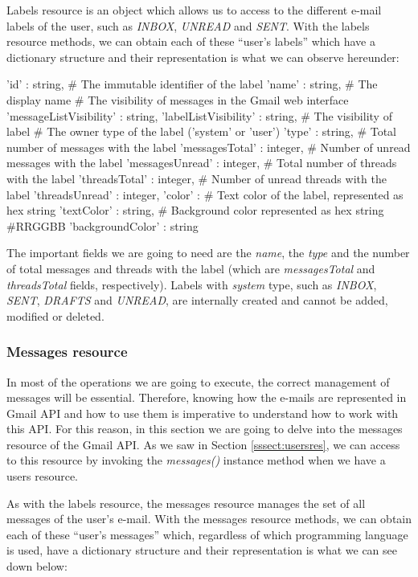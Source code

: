 Labels resource is an object which allows us to access to the different e-mail labels of the user, such as \textit{INBOX}, \textit{UNREAD} and \textit{SENT}. With the labels resource methods, we can obtain each of these ``user's labels'' which have a dictionary structure and their representation is what we can observe hereunder:

\begin{python}
	{
		'id' : string, # The immutable identifier of the label
		'name' : string, # The display name
		# The visibility of messages in the Gmail web interface
		'messageListVisibility' : string,
		'labelListVisibility' : string, # The visibility of label
		# The owner type of the label ('system' or 'user')
		'type' : string,
		# Total number of messages with the label
		'messagesTotal' : integer,
		# Number of unread messages with the label
		'messagesUnread' : integer,
		# Total number of threads with the label
		'threadsTotal' : integer,
		# Number of unread threads with the label
		'threadsUnread' : integer,
		'color' : {
			# Text color of the label, represented as hex string
			'textColor' : string,
			# Background color represented as hex string #RRGGBB
			'backgroundColor' : string 
		}
	}
\end{python}

The important fields we are going to need are the \textit{name}, the \textit{type} and the number of total messages and threads with the label (which are \textit{messagesTotal} and \textit{threadsTotal} fields, respectively). Labels with \textit{system} type, such as \textit{INBOX}, \textit{SENT}, \textit{DRAFTS} and \textit{UNREAD}, are internally created and cannot be added, modified or deleted.

\subsubsection{Messages resource}\label{sssect:msgres}
In most of the operations we are going to execute, the correct management of messages will be essential. Therefore, knowing how the e-mails are represented in Gmail API and how to use them is imperative to understand how to work with this API. For this reason, in this section we are going to delve into the messages resource \citep[/v1/reference/users/messages]{gmailAPI} of the Gmail API. As we saw in Section \ref{sssect:usersres}, we can access to this resource by invoking the \textit{messages()} instance method when we have a users resource.

As with the labels resource, the messages resource manages the set of all messages of the user's e-mail. With the messages resource methods, we can obtain each of these ``user's messages'' which, regardless of which programming language is used, have a dictionary structure and their representation is what we can see down below:

